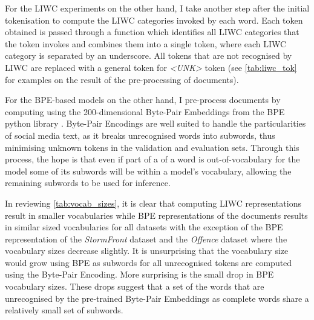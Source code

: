 For the LIWC experiments on the other hand, I take another step after the initial tokenisation to compute the LIWC categories invoked by each word. Each token obtained is passed through a function which identifies all LIWC categories that the token invokes and combines them into a single token, where each LIWC category is separated by an underscore. All tokens that are not recognised by LIWC are replaced with a general token for \textit{<UNK>} token (see \cref{tab:liwc_tok} for examples on the result of the pre-processing of documents).

For the BPE-based models on the other hand, I pre-process documents by computing using the 200-dimensional Byte-Pair Embeddings from the BPE python library \citep{Heinzerling:2018}. Byte-Pair Encodings are well suited to handle the particularities of social media text, as it breaks unrecognised words into subwords, thus minimising unknown tokens in the validation and evaluation sets. Through this process, the hope is that even if part of a of a word is out-of-vocabulary for the model some of its subwords will be within a model's vocabulary, allowing the remaining subwords to be used for inference.

\begin{table}
  \centering
  \caption{Word token and BPE representation.}
  \label{tab:bpe_tok}
\end{table}

In reviewing \cref{tab:vocab_sizes}, it is clear that computing LIWC representations result in smaller vocabularies while BPE representations of the documents results in similar sized vocabularies for all datasets with the exception of the BPE representation of the \textit{StormFront} dataset and the \textit{Offence} dataset where the vocabulary sizes decrease slightly. It is unsurprising that the vocabulary size would grow using BPE as subwords for all unrecognised tokens are computed using the Byte-Pair Encoding. More surprising is the small drop in BPE vocabulary sizes. These drops suggest that a set of the words that are unrecognised by the pre-trained Byte-Pair Embeddings as complete words share a relatively small set of subwords.

